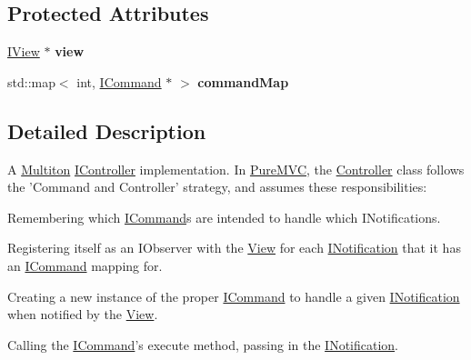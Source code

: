 \subsection*{Protected Attributes}
\begin{DoxyCompactItemize}
\item 
\hypertarget{class_pure_m_v_c_1_1_controller_a53a316e216212890d3b15e379b1edf82}{
\hyperlink{class_pure_m_v_c_1_1_i_view}{IView} $\ast$ {\bfseries view}}
\label{class_pure_m_v_c_1_1_controller_a53a316e216212890d3b15e379b1edf82}

\item 
\hypertarget{class_pure_m_v_c_1_1_controller_a7f5fdd0c009101c605029ea6adb4a578}{
std::map$<$ int, \hyperlink{class_pure_m_v_c_1_1_i_command}{ICommand} $\ast$ $>$ {\bfseries commandMap}}
\label{class_pure_m_v_c_1_1_controller_a7f5fdd0c009101c605029ea6adb4a578}

\end{DoxyCompactItemize}


\subsection{Detailed Description}
A \hyperlink{class_pure_m_v_c_1_1_multiton}{Multiton} {\ttfamily \hyperlink{class_pure_m_v_c_1_1_i_controller}{IController}} implementation. In \hyperlink{namespace_pure_m_v_c}{PureMVC}, the {\ttfamily \hyperlink{class_pure_m_v_c_1_1_controller}{Controller}} class follows the 'Command and Controller' strategy, and assumes these responsibilities: 
\begin{DoxyItemize}
\item Remembering which {\ttfamily \hyperlink{class_pure_m_v_c_1_1_i_command}{ICommand}}s are intended to handle which {\ttfamily INotifications}. 
\item Registering itself as an {\ttfamily IObserver} with the {\ttfamily \hyperlink{class_pure_m_v_c_1_1_view}{View}} for each {\ttfamily \hyperlink{class_pure_m_v_c_1_1_i_notification}{INotification}} that it has an {\ttfamily \hyperlink{class_pure_m_v_c_1_1_i_command}{ICommand}} mapping for. 
\item Creating a new instance of the proper {\ttfamily \hyperlink{class_pure_m_v_c_1_1_i_command}{ICommand}} to handle a given {\ttfamily \hyperlink{class_pure_m_v_c_1_1_i_notification}{INotification}} when notified by the {\ttfamily \hyperlink{class_pure_m_v_c_1_1_view}{View}}. 
\item Calling the {\ttfamily \hyperlink{class_pure_m_v_c_1_1_i_command}{ICommand}}'s {\ttfamily execute} method, passing in the {\ttfamily \hyperlink{class_pure_m_v_c_1_1_i_notification}{INotification}}. 
\end{DoxyItemize}

